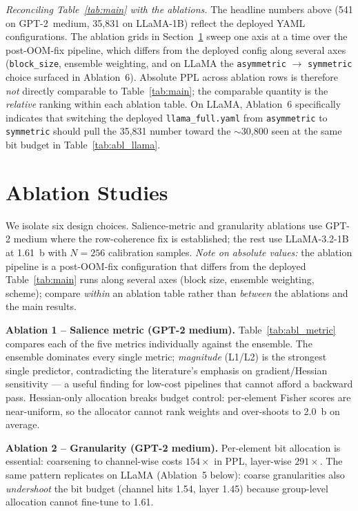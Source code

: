 \documentclass[11pt]{article}
\begin{document}
\textit{Reconciling Table~\ref{tab:main} with the ablations.}
The headline numbers above (541 on GPT-2~medium, 35{,}831 on LLaMA-1B) reflect the
deployed YAML configurations.
The ablation grids in Section~\ref{sec:ablations} sweep one axis at a time over the
post-OOM-fix pipeline, which differs from the deployed config along several axes
(\texttt{block\_size}, ensemble weighting, and on LLaMA the \texttt{asymmetric}
$\rightarrow$ \texttt{symmetric} choice surfaced in Ablation~6).
Absolute PPL across ablation rows is therefore \emph{not} directly comparable to
Table~\ref{tab:main}; the comparable quantity is the \emph{relative} ranking within
each ablation table.
On LLaMA, Ablation~6 specifically indicates that switching the deployed
\texttt{llama\_full.yaml} from \texttt{asymmetric} to \texttt{symmetric} should pull the
35{,}831 number toward the $\sim$30{,}800 seen at the same bit budget in
Table~\ref{tab:abl_llama}.

\section{Ablation Studies}
\label{sec:ablations}

We isolate six design choices.
Salience-metric and granularity ablations use GPT-2 medium where the row-coherence fix is
established; the rest use LLaMA-3.2-1B at 1.61~b with $N{=}256$ calibration samples.
\emph{Note on absolute values:} the ablation pipeline is a post-OOM-fix configuration that
differs from the deployed Table~\ref{tab:main} runs along several axes (block size,
ensemble weighting, scheme); compare \emph{within} an ablation table rather than
\emph{between} the ablations and the main results.

\textbf{Ablation 1 -- Salience metric (GPT-2 medium).}
Table~\ref{tab:abl_metric} compares each of the five metrics individually against the
ensemble.
The ensemble dominates every single metric;
\emph{magnitude} (L1/L2) is the strongest single predictor, contradicting the literature's
emphasis on gradient/Hessian sensitivity --- a useful finding for low-cost pipelines that
cannot afford a backward pass.
Hessian-only allocation breaks budget control: per-element Fisher scores are near-uniform,
so the allocator cannot rank weights and over-shoots to 2.0~b on average.

\textbf{Ablation 2 -- Granularity (GPT-2 medium).}
Per-element bit allocation is essential: coarsening to channel-wise costs $154\times$ in
PPL, layer-wise $291\times$.
The same pattern replicates on LLaMA (Ablation~5 below): coarse granularities also
\emph{undershoot} the bit budget (channel hits 1.54, layer 1.45) because group-level
allocation cannot fine-tune to 1.61.
\end{document}
